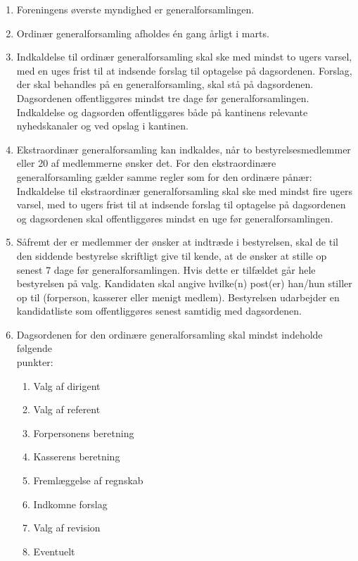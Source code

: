 \documentclass[a4paper, 10pt]{article}
\renewcommand\thesection{\textsection\arabic{section}}
\newenvironment{stykenum}{
  \begin{enumerate}[%
    label=Stk.~\arabic*., ref=\thesection~Stk.~\arabic*, start=1]
}{\end{enumerate}}
\begin{document}
\begin{stykenum}

\item Foreningens øverste myndighed er generalforsamlingen.

\item Ordinær generalforsamling afholdes én gang årligt i marts.

\item Indkaldelse til ordinær generalforsamling skal ske med mindst to
ugers varsel, med en uges frist til at indsende forslag til optagelse
på dagsordenen. Forslag, der skal behandles på en generalforsamling,
skal stå på dagsordenen. Dagsordenen offentliggøres mindst tre dage
før generalforsamlingen. Indkaldelse og dagsorden offentliggøres både
på kantinens relevante nyhedskanaler og ved opslag i kantinen.

\item Ekstraordinær generalforsamling kan indkaldes, når to
bestyrelsesmed\-lemmer eller 20 af medlemmerne ønsker det. For den
ekstraordinære generalforsamling gælder samme regler som for den
ordinære pånær: Indkaldelse til ekstraordinær generalforsamling skal
ske med mindst fire ugers varsel, med to ugers frist til at indsende
forslag til optagelse på dagsordenen og dagsordenen skal
offentliggøres mindst en uge før generalforsamlingen.

\item \label{generalforsamling-bestyrelse} Såfremt der er medlemmer der ønsker
at indtræde i bestyrelsen,
skal de til den siddende bestyrelse skriftligt give til kende, at de
ønsker at stille op senest 7 dage før generalforsamlingen.  Hvis dette er
tilfældet går hele bestyrelsen på valg. Kandidaten skal angive
hvilke(n) post(er) han/hun stiller op til (forperson, kasserer eller
menigt medlem). Bestyrelsen udarbejder en kandidatliste som
offentliggøres senest samtidig med dagsordenen.

\item Dagsordenen for den ordinære generalforsamling skal mindst
indeholde følgende \\ punkter:

\begin{enumerate}

\item Valg af dirigent

\item Valg af referent

\item Forpersonens beretning

\item Kasserens beretning

\item Fremlæggelse af regnskab

\item Indkomne forslag

\item Valg af revision

\item Eventuelt

\end{enumerate}

\end{stykenum}
\end{document}

